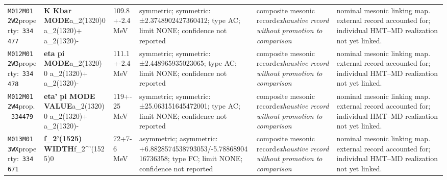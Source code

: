 \begin{landscape}
\begin{longtable}{L{1.85cm}L{4.45cm}L{2.35cm}L{4.05cm}L{3.35cm}L{7.15cm}}
\texttt{M012}\newline \texttt{M012W2}\newline property:\ \texttt{334477} & \textbf{K Kbar MODE}\newline a\_\allowbreak{}2(1320)0 \textbar{}\allowbreak{} a\_\allowbreak{}2(1320)+ \textbar{}\allowbreak{} a\_\allowbreak{}2(1320)- & 109.8+-2.4\,MeV & symmetric; symmetric: ±2.3748902427360412; type AC; limit NONE; confidence not reported & composite mesonic record\newline \emph{exhaustive record without promotion to comparison} & nominal mesonic linking map. external record accounted for; individual HMT--MD realization not yet linked. \\
\texttt{M012}\newline \texttt{M012W3}\newline property:\ \texttt{334478} & \textbf{eta pi MODE}\newline a\_\allowbreak{}2(1320) 0 \textbar{}\allowbreak{} a\_\allowbreak{}2(1320)+ \textbar{}\allowbreak{} a\_\allowbreak{}2(1320)- & 111.1+-2.4\,MeV & symmetric; symmetric: ±2.448965935023065; type AC; limit NONE; confidence not reported & composite mesonic record\newline \emph{exhaustive record without promotion to comparison} & nominal mesonic linking map. external record accounted for; individual HMT--MD realization not yet linked. \\
\texttt{M012}\newline \texttt{M012W4}\newline prop.\ \texttt{334479} & \textbf{eta' pi MODE VALUE}\newline a\_\allowbreak{}2(1320)0 \textbar{}\allowbreak{} a\_\allowbreak{}2(1320)+ \textbar{}\allowbreak{} a\_\allowbreak{}2(1320)- & 119+-25\,MeV & symmetric; symmetric: ±25.063151645472001; type AC; limit NONE; confidence not reported & composite mesonic record\newline \emph{exhaustive record without promotion to comparison} & nominal mesonic linking map. external record accounted for; individual HMT--MD realization not yet linked. \\
\texttt{M013}\newline \texttt{M013WX}\newline property:\ \texttt{334671} & \textbf{f\_\allowbreak{}2'(1525) WIDTH}\newline f\_\allowbreak{}2\textasciicircum{}'(1525)0 & 72+7-6\,MeV & asymmetric; asymmetric: +6.8828574538793053/-5.7886890416736358; type FC; limit NONE; confidence not reported & composite mesonic record\newline \emph{exhaustive record without promotion to comparison} & nominal mesonic linking map. external record accounted for; individual HMT--MD realization not yet linked. \\

\end{longtable}
\end{landscape}
